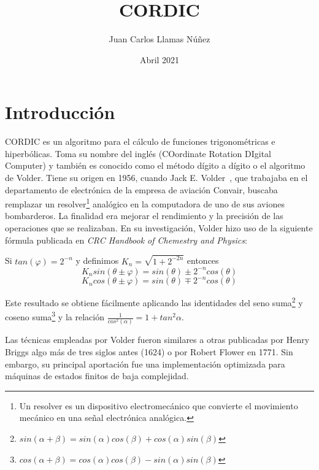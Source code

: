 \documentclass[12pt, a4paper]{article}
\title{CORDIC}
\author{Juan Carlos Llamas Núñez }
\date{Abril 2021}
\begin{document}
\maketitle
\section{Introducción}
\setlength{\parskip}{1em}
CORDIC es un algoritmo para el cálculo de funciones trigonométricas e hiperbólicas. Toma su nombre del inglés (COordinate Rotation DIgital Computer) y también es conocido como el método dígito a dígito o el algoritmo de Volder. Tiene su origen en 1956, cuando Jack E. Volder~\cite{volder}, que trabajaba en el departamento de electrónica de la empresa de aviación Convair, buscaba remplazar un resolver\footnote{Un resolver es un dispositivo electromecánico que convierte el movimiento mecánico en una señal electrónica analógica.} analógico en la computadora de uno de sus aviones bombarderos. La finalidad era mejorar el rendimiento y la precisión de las operaciones que se realizaban. En su investigación, Volder hizo uso de la siguiente fórmula publicada en \textit{CRC Handbook of Chemestry and Physics}:


Si $tan(\varphi)=2^{-n}$ y definimos $K_n=\sqrt{1+2^{-2n}}$ entonces 
\[
K_nsin(\theta \pm \varphi)=sin(\theta) \pm 2^{-n} cos(\theta)
\]\[
K_ncos(\theta \pm \varphi)=sin(\theta) \mp 2^{-n} cos(\theta)
\]

Este resultado se obtiene fácilmente aplicando las identidades del seno suma\footnote{$sin(\alpha + \beta)=sin(\alpha)cos(\beta) + cos(\alpha)sin(\beta)$} y coseno suma\footnote{$cos(\alpha + \beta)=cos(\alpha)cos(\beta) - sin(\alpha)sin(\beta)$} y la relación $\frac{1}{cos^2(\alpha)}=1+tan^2\alpha$.

Las técnicas empleadas por Volder fueron similares a otras publicadas por Henry Briggs algo más de tres siglos antes (1624) o por Robert Flower en 1771. Sin embargo, su principal aportación fue una implementación optimizada para máquinas de estados finitos de baja complejidad.
\end{document}
